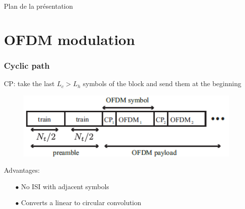 \documentclass[11pt]{beamer}
\begin{document}
{
	\begin{frame}[noframenumbering]{Plan de la présentation}
		\tableofcontents
	\end{frame}
}

\section{OFDM modulation}

\begin{frame}
\frametitle{Cyclic path}
CP: take the last $L_c>L_h$ symbols of the block and send them at the beginning
\begin{figure}[!ht]
\centering
\includegraphics[scale=0.55]{img/operation_ofdm.png}
\label{fig1}
\end{figure}
Advantages:
\begin{itemize}

\item[$\bullet$] No ISI with adjacent symbols  
\item[$\bullet$] Converts a linear to circular convolution


\end{itemize}

\end{frame}
\end{document}
